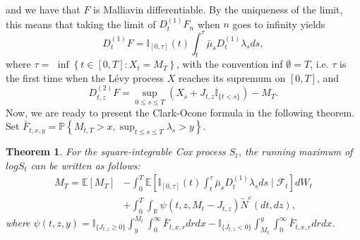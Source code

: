 \documentclass[11pt]{article}
\numberwithin{equation}{section}
\newtheorem{Theorem}{Theorem}[section]
\begin{document}
 and we have that $F$ is Malliavin differentiable. By the uniqueness of the limit, this means that taking the limit of $D_{t}^{(1)} F_{n}$ when $n$ goes to infinity yields $$D_{t}^{(1)} F= \mathbb{I}_{[0, \tau]}(t)\int_t^\tau \bar{\mu}_s D_t^{(1)}\lambda_s ds,$$
where $\tau=$ $\inf \left\{t \in[0, T]: X_{t}=M_{T}\right\}$, with the convention inf $\emptyset=T$, i.e. $\tau$ is the first time when the Lévy process $X$ reaches its supremum on $[0, T]$, and
\begin{equation}\label{d2cox}
D_{t, z}^{(2)} F=\sup _{0 \leq s \leq T}\left(X_{s}+J_{t,z} \mathbb{I}_{\{t<s\}}\right)-M_{T}.
\end{equation}
Now, we are ready to present the Clark-Ocone formula in the following theorem.  Set $\bar{F}_{t, x, y}=\mathbb{P}\left\{M_{t,T}>x, \sup_{t \leq s \leq T} \lambda_s > y\right\}$. 
\begin{Theorem}
For the square-integrable Cox process $S_t$, the running maximum of $log S_t$ can be written as follows:
\begin{align*}
M_{T}=\mathbb{E}\left[M_{T}\right] &-\int_{0}^{T} \mathbb{E}\left[ \mathbb{I}_{[0, \tau]}(t)\int_t^\tau \bar{\mu}_s D_t^{(1)}\lambda_s ds\mid \mathcal{F}_{t}\right] dW_t \\
& +\int_{0}^{T} \int_{\mathbb{R}} \psi\left(t, z, M_{t}-J_{t, z}\right) \tilde{N}^c(d t, d z),
\end{align*}
where $\psi(t, z, y)=\mathbb{I}_{\{J_{t,z} \geq 0\}}\int_{y}^{M_t} \int_{0}^{\infty}\bar{F}_{t, x, r}dr d x -  \mathbb{I}_{\{J_{t,z} < 0\}}\int_{M_t}^{y} \int_{0}^{\infty}\bar{F}_{t, x, r}dr d x$.
\end{Theorem}
\end{document}
